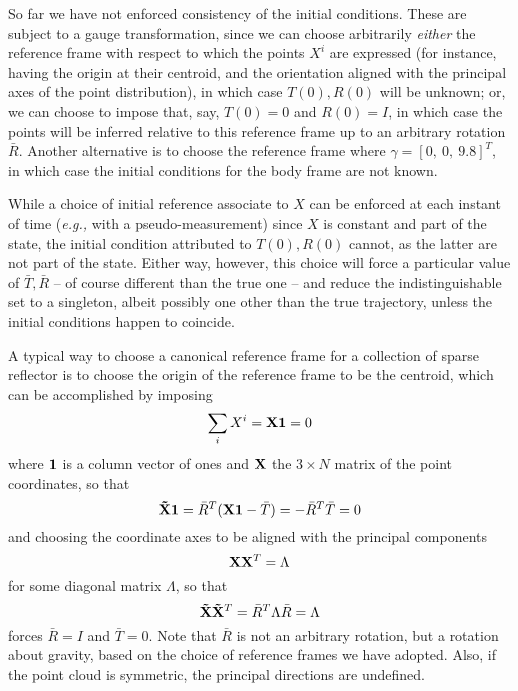 \documentclass[]{article}
\def\Xw{\tilde{X}}
\begin{document}
So far we have not enforced consistency of the initial conditions. These are subject to a gauge transformation, since we can choose arbitrarily {\em either} the reference frame with respect to which the points $X^i$ are expressed (for instance, having the origin at their centroid, and the orientation aligned with the principal axes of the point distribution), in which case $T(0), R(0)$ will be unknown; or, we can choose to impose that, say, $T(0) = 0$ and $R(0) = I$, in which case the points will be inferred relative to this reference frame up to an arbitrary rotation $\bar R$. Another alternative is to choose the reference frame where $\gamma = [0, \ 0, \ 9.8]^T$, in which case the initial conditions for the body frame are not known.

While a choice of initial reference associate to $X$ can be enforced at each instant of time ({\em e.g.,} with a pseudo-measurement) since $X$ is constant and part of the state, the initial condition attributed to $T(0), R(0)$ cannot, as the latter are not part of the state. Either way, however, this choice will force a particular value of $\bar T, \bar R$ -- of course different than the true one -- and reduce the indistinguishable set to a singleton, albeit possibly one other than the true trajectory, unless the initial conditions happen to coincide. 

A typical way to choose a canonical reference frame for a collection of sparse reflector is to choose the origin of the reference frame to be the centroid, which can be accomplished by imposing
\begin{equation}
\sum_i X^i = {\bf X 1} = 0
\end{equation}
where $\bf 1$ is a column vector of ones and $\bf X$ the $3\times N$ matrix of the point coordinates,  so that
\begin{equation}
{\bf \Xw 1} = \bar R^T( {\bf X 1} - \bar T) = -\bar R^T \bar T = 0
\end{equation}
and choosing the coordinate axes to be aligned with the principal components
\begin{equation}
{\bf X}{\bf X}^T = \Lambda
\end{equation}
for some diagonal matrix $\Lambda$, so that 
\begin{equation}
{\bf \Xw}{\bf \Xw}^T = \bar R^T \Lambda \bar R = \Lambda
\end{equation}
forces $\bar R = I$ and $\bar T = 0$. Note that $\bar R$ is not an arbitrary rotation, but a rotation about gravity, based on the choice of reference frames we have adopted. Also, if the point cloud is symmetric, the principal directions are undefined. 
\end{document}

